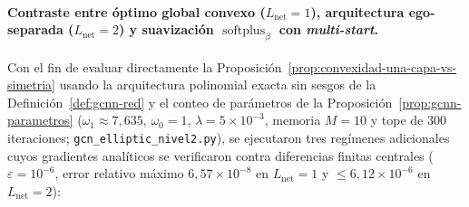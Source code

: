 \documentclass[a4paper,openany,oneside,10pt]{report}
\theoremstyle{pnlTeorema}
\theoremstyle{pnlDefinicion}
\theoremstyle{pnlObservacion}
\begin{document}
\paragraph{Contraste entre óptimo global convexo ($L_{\mathrm{net}}=1$), arquitectura ego-separada ($L_{\mathrm{net}}=2$) y suavización $\operatorname{softplus}_\beta$ con \emph{multi-start}.}
Con el fin de evaluar directamente la Proposición~\ref{prop:convexidad-una-capa-vs-simetria} usando la arquitectura polinomial exacta sin sesgos de la Definición~\ref{def:gcnn-red} y el conteo de parámetros de la Proposición~\ref{prop:gcnn-parametros} ($\omega_1\approx 7{,}635$, $\omega_0=1$, $\lambda=5\times 10^{-3}$, memoria $M=10$ y tope de $300$ iteraciones; \texttt{gcn\_elliptic\_nivel2.py}), se ejecutaron tres regímenes adicionales cuyos gradientes analíticos se verificaron contra diferencias finitas centrales ($\varepsilon=10^{-6}$, error relativo máximo $6{,}57\times 10^{-8}$ en $L_{\mathrm{net}}=1$ y $\le 6{,}12\times 10^{-6}$ en $L_{\mathrm{net}}=2$):
\end{document}
